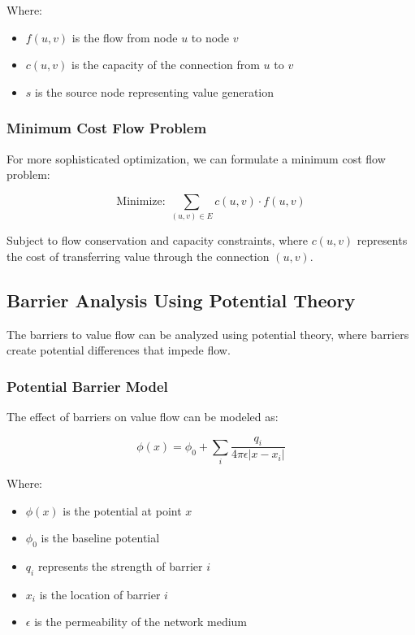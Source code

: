 Where:
\begin{itemize}
    \item $f(u, v)$ is the flow from node $u$ to node $v$
    \item $c(u, v)$ is the capacity of the connection from $u$ to $v$
    \item $s$ is the source node representing value generation
\end{itemize}

\subsubsection{Minimum Cost Flow Problem}

For more sophisticated optimization, we can formulate a minimum cost flow problem:

\begin{equation}
\text{Minimize: } \sum_{(u,v) \in E} c(u,v) \cdot f(u,v)
\end{equation}

Subject to flow conservation and capacity constraints, where $c(u,v)$ represents the cost of transferring value through the connection $(u,v)$.

\subsection{Barrier Analysis Using Potential Theory}

The barriers to value flow can be analyzed using potential theory, where barriers create potential differences that impede flow.

\subsubsection{Potential Barrier Model}

The effect of barriers on value flow can be modeled as:

\begin{equation}
\phi(x) = \phi_0 + \sum_{i} \frac{q_i}{4\pi \epsilon |x - x_i|}
\end{equation}

Where:
\begin{itemize}
    \item $\phi(x)$ is the potential at point $x$
    \item $\phi_0$ is the baseline potential
    \item $q_i$ represents the strength of barrier $i$
    \item $x_i$ is the location of barrier $i$
    \item $\epsilon$ is the permeability of the network medium
\end{itemize}

